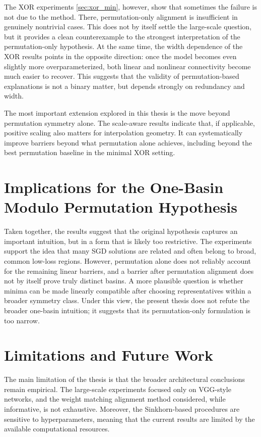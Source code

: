 \documentclass[11pt,a4paper]{report}
\begin{document}
The XOR experiments \ref{sec:xor_min}, however, show that sometimes the failure is not due to the method. There, permutation-only alignment is insufficient in genuinely nontrivial cases. This does not by itself settle the large-scale question, but it provides a clean counterexample to the strongest interpretation of the permutation-only hypothesis. At the same time, the width dependence of the XOR results points in the opposite direction: once the model becomes even slightly more overparameterized, both linear and nonlinear connectivity become much easier to recover. This suggests that the validity of permutation-based explanations is not a binary matter, but depends strongly on redundancy and width.

The most important extension explored in this thesis is the move beyond permutation symmetry alone. The scale-aware results indicate that, if applicable, positive scaling also matters for interpolation geometry. It can systematically improve barriers beyond what permutation alone achieves, including beyond the best permutation baseline in the minimal XOR setting.

\section{Implications for the One-Basin Modulo Permutation Hypothesis}

Taken together, the results suggest that the original hypothesis captures an important intuition, but in a form that is likely too restrictive. The experiments support the idea that many SGD solutions are related and often belong to broad, common low-loss regions. However, permutation alone does not reliably account for the remaining linear barriers, and a barrier after permutation alignment does not by itself prove truly distinct basins. A more plausible question is whether minima can be made linearly compatible after choosing representatives within a broader symmetry class. Under this view, the present thesis does not refute the broader one-basin intuition; it suggests that its permutation-only formulation is too narrow.

\section{Limitations and Future Work}

The main limitation of the thesis is that the broader architectural conclusions remain empirical. The large-scale experiments focused only on VGG-style networks, and the weight matching alignment method considered, while informative, is not exhaustive. Moreover, the Sinkhorn-based procedures are sensitive to hyperparameters, meaning that the current results are limited by the available computational resources.
\end{document}
